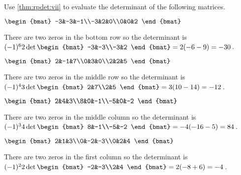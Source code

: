 \begin{example} \label{eg:rpdet}
Use \cref{thm:rpdet:vii} to evaluate the determinant of the following matrices.  
\begin{Parts}
\item \(\begin{bmat} -3&-3&-1\\-3&2&0\\0&0&2 \end{bmat}\)
\begin{solution} 
There are two zeros in the bottom row so the determinant is \((-1)^62\det\begin{bmat} -3&-3\\-3&2 \end{bmat}=2(-6-9)=-30\)\,. 
\end{solution}

\item \(\begin{bmat} 2&-1&7\\0&3&0\\2&2&5 \end{bmat}\)
\begin{solution} 
There are two zeros in the middle row so the determinant is \((-1)^43\det\begin{bmat} 2&7\\2&5 \end{bmat}=3(10-14)=-12\)\,. 
\end{solution}

\begin{OmitV1}
\item \(\begin{bmat} 2&4&3\\8&0&-1\\-5&0&-2 \end{bmat}\)
\begin{solution} 
There are two zeros in the middle column so the determinant is \((-1)^34\det\begin{bmat} 8&-1\\-5&-2 \end{bmat}=-4(-16-5)=84\)\,. 
\end{solution}
\end{OmitV1}

\item \(\begin{bmat} 2&1&3\\0&-2&-3\\0&2&4 \end{bmat}\)
\begin{solution} 
There are two zeros in the first column so the determinant is \((-1)^22\det\begin{bmat} -2&-3\\2&4 \end{bmat}=2(-8+6)=-4\)\,. 
\end{solution}

\end{Parts}
\end{example}
